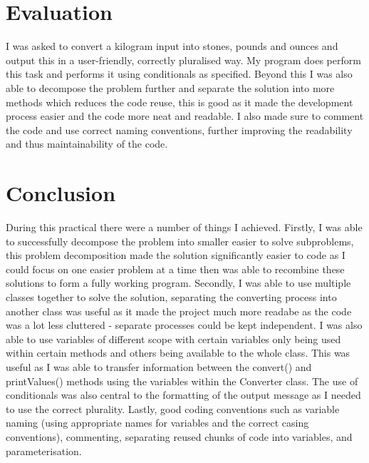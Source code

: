 \documentclass[a4paper]{article}
\begin{document}
\section*{Evaluation}
I was asked to convert a kilogram input into stones, pounds and ounces and output this in a user-friendly, correctly pluralised way. My program does 
perform this task and performs it using conditionals as specified. Beyond this I was also able to decompose the 
problem further and separate the solution into more methods which reduces the code reuse, this is good as it made the development process easier and 
the code more neat and readable. I also made sure to comment the code and use correct naming conventions, further improving the readability and thus 
maintainability of the code.

\section*{Conclusion}
During this practical there were a number of things I achieved. Firstly, I was able to successfully decompose the problem into smaller easier to solve 
subproblems, this problem decomposition made the solution significantly easier to code as I could focus on one easier problem at a time then was able 
to recombine these solutions to form a fully working program. Secondly, I was able to use multiple classes together to solve the solution, separating 
the converting process into another class was useful as it made the project much more readabe as the code was a lot less cluttered - separate 
processes could be kept independent. I was also able to use variables of different scope with certain variables only being used within certain methods 
and others being available to the whole class. This was useful as I was able to transfer information between the convert() and printValues() methods 
using the variables within the Converter class. The use of conditionals was also central to the formatting of the output message as I needed to use 
the correct plurality. Lastly, good coding conventions such as variable naming (using appropriate names for variables and the correct casing 
conventions), commenting, separating reused chunks of code into variables, and parameterisation.
\end{document}
